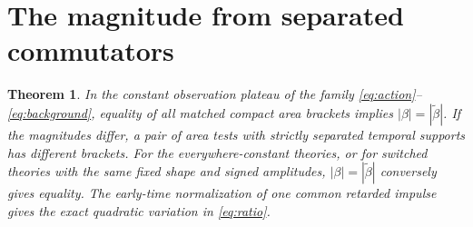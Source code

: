\documentclass[11pt]{article}
\newtheorem{theorem}{Theorem}[section]
\begin{document}
\section{The magnitude from separated commutators}\label{sec:cubic}

\begin{samepage}
\begin{theorem}\label{thm:main}
In the constant observation plateau of the family \eqref{eq:action}--\eqref{eq:background}, equality of all matched compact area brackets implies $|\beta|=|\widetilde\beta|$. If the magnitudes differ, a pair of area tests with strictly separated temporal supports has different brackets. For the everywhere-constant theories, or for switched theories with the same fixed shape and signed amplitudes, $|\beta|=|\widetilde\beta|$ conversely gives equality. The early-time normalization of one common retarded impulse gives the exact quadratic variation in \eqref{eq:ratio}.
\end{theorem}
\end{samepage}
\end{document}
